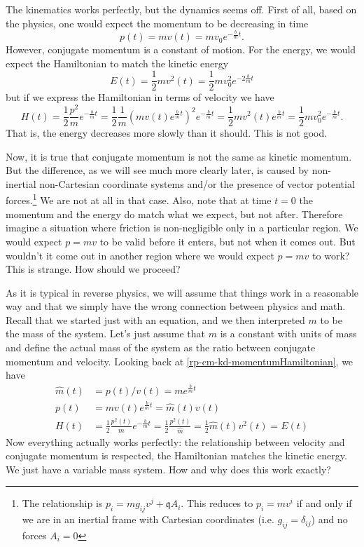 The kinematics works perfectly, but the dynamics seems off. First of all, based on the physics, one would expect the momentum to be decreasing in time
\begin{equation}
	p(t)=m v(t) = m v_0 e^{-\frac{b}{m}t}.
\end{equation}
However, conjugate momentum is a constant of motion. For the energy, we would expect the Hamiltonian to match the kinetic energy
\begin{equation}
	E(t)=\frac{1}{2} m v^2(t) = \frac{1}{2} m v_0^2 e^{-2\frac{b}{m}t}
\end{equation}
but if we express the Hamiltonian in terms of velocity we have
\begin{equation}
	H(t)=\frac{1}{2} \frac{p^2}{m} e^{-\frac{b}{m}t} = \frac{1}{2} \frac{1}{m} \left( m v(t) e^{\frac{b}{m}t} \right)^2 e^{-\frac{b}{m}t}= \frac{1}{2} m v^2(t) e^{\frac{b}{m}t} = \frac{1}{2} m v_0^2 e^{-\frac{b}{m}t}.
\end{equation}
That is, the energy decreases more slowly than it should. This is not good.

Now, it is true that conjugate momentum is not the same as kinetic momentum. But the difference, as we will see much more clearly later, is caused by non-inertial non-Cartesian coordinate systems and/or the presence of vector potential forces.\footnote{The relationship is $p_i = m g_{ij} v^j + \mathfrak{q} A_i$. This reduces to $p_i = m v^i$ if and only if we are in an inertial frame with Cartesian coordinates (i.e. $g_{ij}=\delta_{ij}$) and no forces $A_i = 0$} We are not at all in that case. Also, note that at time $t=0$ the momentum and the energy do match what we expect, but not after. Therefore imagine a situation where friction is non-negligible only in a particular region. We would expect $p=mv$ to be valid before it enters, but not when it comes out. But wouldn't it come out in another region where we would expect $p=mv$ to work? This is strange. How should we proceed?

As it is typical in reverse physics, we will assume that things work in a reasonable way and that we simply have the wrong connection between physics and math. Recall that we started just with an equation, and we then interpreted $m$ to be the mass of the system. Let's just assume that $m$ is a constant with units of mass and define the actual mass of the system as the ratio between conjugate momentum and velocity. Looking back at \ref{rp-cm-kd-momentumHamiltonian}, we have 
\begin{equation}
	\begin{aligned}
	\hat{m}(t) &= p(t) / v(t) = m e^{\frac{b}{m}t} \\
	p(t) &= mv(t)e^{\frac{b}{m}t} = \hat{m}(t) v(t) \\
	H(t) &= \frac{1}{2} \frac{p^2(t)}{m}  e^{-\frac{b}{m}t} = \frac{1}{2} \frac{p^2(t)}{\hat{m}} = \frac{1}{2} \hat{m}(t) v^2(t) = E(t)
	\end{aligned}
\end{equation}
Now everything actually works perfectly: the relationship between velocity and conjugate momentum is respected, the Hamiltonian matches the kinetic energy. We just have a variable mass system. How and why does this work exactly?

